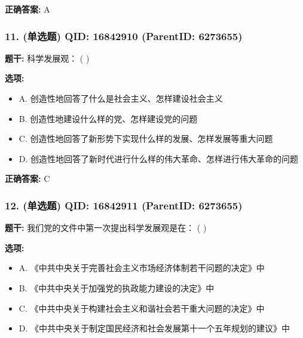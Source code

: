 \documentclass[12pt,UTF8]{ctexart}
\begin{document}
\textbf{正确答案:}
A

\vspace{0.3em}\hrulefill\vspace{0.7em}

\subsubsection*{11. (单选题) \small QID: 16842910 (ParentID: 6273655)}

\textbf{题干:}
科学发展观： ( )



\textbf{选项:}
\begin{itemize}[leftmargin=*]

  \item A. 创造性地回答了什么是社会主义、怎样建设社会主义

  \item B. 创造性地建设什么样的党、怎样建设党的问题

  \item C. 创造性地回答了新形势下实现什么样的发展、怎样发展等重大问题

  \item D. 创造性地回答了新时代进行什么样的伟大革命、怎样进行伟大革命的问题

\end{itemize}

\textbf{正确答案:}
C

\vspace{0.3em}\hrulefill\vspace{0.7em}

\subsubsection*{12. (单选题) \small QID: 16842911 (ParentID: 6273655)}

\textbf{题干:}
我们党的文件中第一次提出科学发展观是在： ( )



\textbf{选项:}
\begin{itemize}[leftmargin=*]

  \item A. 《中共中央关于完善社会主义市场经济体制若干问题的决定》中

  \item B. 《中共中央关于加强党的执政能力建设的决定》中

  \item C. 《中共中央关于构建社会主义和谐社会若干重大问题的决定》中

  \item D. 《中共中央关于制定国民经济和社会发展第十一个五年规划的建议》中

\end{itemize}
\end{document}

